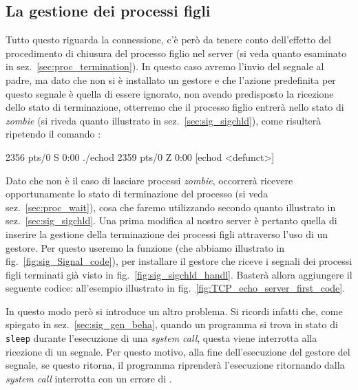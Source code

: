 \subsection{La gestione dei processi figli}
\label{sec:TCP_child_hand}

Tutto questo riguarda la connessione, c'è però da tenere conto dell'effetto
del procedimento di chiusura del processo figlio nel server (si veda quanto
esaminato in sez.~\ref{sec:proc_termination}). In questo caso avremo l'invio
del segnale  al padre, ma dato che non si è installato un
gestore e che l'azione predefinita per questo segnale è quella di essere
ignorato, non avendo predisposto la ricezione dello stato di terminazione,
otterremo che il processo figlio entrerà nello stato di \textit{zombie} (si
riveda quanto illustrato in sez.~\ref{sec:sig_sigchld}), come risulterà
ripetendo il comando :
\begin{Terminal}
 2356 pts/0    S      0:00 ./echod
 2359 pts/0    Z      0:00 [echod <defunct>]
\end{Terminal}

Dato che non è il caso di lasciare processi \textit{zombie}, occorrerà
ricevere opportunamente lo stato di terminazione del processo (si veda
sez.~\ref{sec:proc_wait}), cosa che faremo utilizzando 
secondo quanto illustrato in sez.~\ref{sec:sig_sigchld}. Una prima modifica al
nostro server è pertanto quella di inserire la gestione della terminazione dei
processi figli attraverso l'uso di un gestore.  Per questo useremo la funzione
 (che abbiamo illustrato in fig.~\ref{fig:sig_Signal_code}), per
installare il gestore che riceve i segnali dei processi figli terminati già
visto in fig.~\ref{fig:sig_sigchld_handl}.  Basterà allora aggiungere il
seguente codice: 
\noindent
all'esempio illustrato in fig.~\ref{fig:TCP_echo_server_first_code}.

In questo modo però si introduce un altro problema. Si ricordi infatti che,
come spiegato in sez.~\ref{sec:sig_gen_beha}, quando un programma si trova in
stato di \texttt{sleep} durante l'esecuzione di una \textit{system call},
questa viene interrotta alla ricezione di un segnale. Per questo motivo, alla
fine dell'esecuzione del gestore del segnale, se questo ritorna, il programma
riprenderà l'esecuzione ritornando dalla \textit{system call} interrotta con
un errore di .

